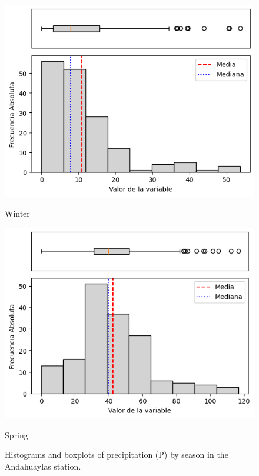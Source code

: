 \begin{figure}[H]
\begin{minipage}{0.30\textwidth}
  \includegraphics[width=\linewidth]{resultados/por_estacion_del_anio/boxplot_clases_por_estacion/Andahuaylas/P_HistBoxplot_Winter.png}
  \caption*{Winter}
\end{minipage}
\hfill
\begin{minipage}{0.30\textwidth}
  \includegraphics[width=\linewidth]{resultados/por_estacion_del_anio/boxplot_clases_por_estacion/Andahuaylas/P_HistBoxplot_Spring.png}
  \caption*{Spring}
\end{minipage}
\caption{Histograms and boxplots of precipitation (P) by season in the Andahuaylas station.}
\label{fig:andahuaylas_p_hist}
\end{figure}

